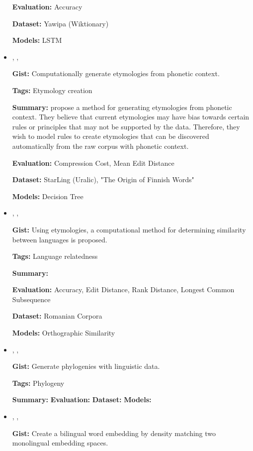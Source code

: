 \documentclass{article}[a4paper]
\newcommand{\bitem}[2]{
    \item[\cite{#1}]
        \citetitle{#1}, \citeauthor{#1}, \citeyear{#1}
        \newline
        {#2}
}%
\begin{document}
\begin{itemize}
{        \textbf{Evaluation:}
        Accuracy

        \textbf{Dataset:}
        Yawipa (Wiktionary)

        \textbf{Models:}
        LSTM
    }%

    \bitem{wettig_using_2012}%
    {%
        \textbf{Gist:}
        Computationally generate etymologies from phonetic context.

        \textbf{Tags:}
        Etymology creation

        \textbf{Summary:}
        \citeauthor{wettig_using_2012} propose a method for generating
        etymologies from phonetic context. They believe that current etymologies
        may have bias towards certain rules or principles that may not be
        supported by the data. Therefore, they wish to model rules to create
        etymologies that can be discovered automatically from the raw corpus
        with phonetic context.

        \textbf{Evaluation:}
        Compression Cost, Mean Edit Distance

        \textbf{Dataset:}
        StarLing (Uralic), "The Origin of Finnish Words"

        \textbf{Models:}
        Decision Tree
    }%

    \bitem{ciobanu_etymological_2014}%
    {%
        \textbf{Gist:}
        Using etymologies, a computational method for determining similarity
        between languages is proposed.

        \textbf{Tags:}
        Language relatedness

        \textbf{Summary:}

        \textbf{Evaluation:}
        Accuracy, Edit Distance, Rank Distance, Longest Common Subsequence

        \textbf{Dataset:}
        Romanian Corpora

        \textbf{Models:}
        Orthographic Similarity
    }%

    \bitem{nouri_alignment_2016}%
    {%
        \textbf{Gist:}
        Generate phylogenies with linguistic data.

        \textbf{Tags:}
        Phylogeny

        \textbf{Summary:}
        \textbf{Evaluation:}
        \textbf{Dataset:}
        \textbf{Models:}
    }%

    \bitem{zhou_density_2019}%
    {%
        \textbf{Gist:}
        Create a bilingual word embedding by density matching two monolingual
        embedding spaces.

}
\end{itemize}
\end{document}
